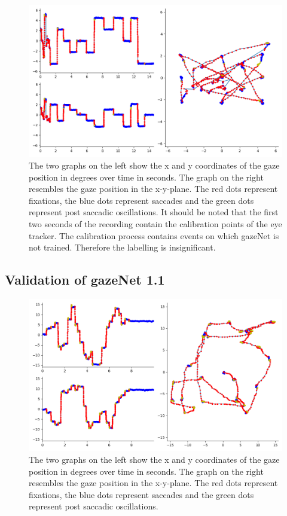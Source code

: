 \documentclass[conference]{IEEEtran}
\begin{document}
\begin{figure}[ht]
    \includegraphics[width=\linewidth]{Kreuze_Random Recording1_short}
    \caption{The two graphs on the left show the x and y coordinates of the gaze position in degrees over time in seconds. The graph on the right resembles the gaze position in the x-y-plane. The red dots represent fixations, the blue dots represent saccades and the green dots represent post saccadic oscillations. It should be noted that the first two seconds of the recording contain the calibration points of the eye tracker. The calibration process contains events on which gazeNet is not trained. Therefore the labelling is insignificant.}
\end{figure}

\subsection{Validation of gazeNet 1.1}
\begin{figure}[ht]
    \includegraphics[width=\linewidth]{TH34_img_Europe_labelled_MN}
    \caption{The two graphs on the left show the x and y coordinates of the gaze position in degrees over time in seconds. The graph on the right resembles the gaze position in the x-y-plane. The red dots represent fixations, the blue dots represent saccades and the green dots represent post saccadic oscillations.}
\end{figure}



\end{document}
